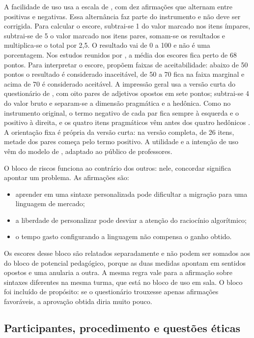 A facilidade de uso usa a escala de , com dez afirmações que alternam entre positivas e negativas. Essa alternância faz parte do instrumento e não deve ser corrigida. Para calcular o escore, subtrai-se 1 do valor marcado nos itens ímpares, subtrai-se de 5 o valor marcado nos itens pares, somam-se os resultados e multiplica-se o total por 2,5. O resultado vai de 0 a 100 e não é uma porcentagem. Nos estudos reunidos por , a média dos escores fica perto de 68 pontos. Para interpretar o escore,  propõem faixas de aceitabilidade: abaixo de 50 pontos o resultado é considerado inaceitável, de 50 a 70 fica na faixa marginal e acima de 70 é considerado aceitável. A impressão geral usa a versão curta do questionário de , com oito pares de adjetivos opostos em sete pontos; subtrai-se 4 do valor bruto e separam-se a dimensão pragmática e a hedônica. Como no instrumento original, o termo negativo de cada par fica sempre à esquerda e o positivo à direita, e os quatro itens pragmáticos vêm antes dos quatro hedônicos \cite{schrepp2023handbook}. A orientação fixa é própria da versão curta: na versão completa, de 26 itens, metade dos pares começa pelo termo positivo. A utilidade e a intenção de uso vêm do modelo de , adaptado ao público de professores.

O bloco de riscos funciona ao contrário dos outros: nele, concordar significa apontar um problema. As afirmações são:

\begin{itemize}
    \item aprender em uma sintaxe personalizada pode dificultar a migração para uma linguagem de mercado;
    \item a liberdade de personalizar pode desviar a atenção do raciocínio algorítmico;
    \item o tempo gasto configurando a linguagem não compensa o ganho obtido.
\end{itemize}
 Os escores desse bloco são relatados separadamente e não podem ser somados aos do bloco de potencial pedagógico, porque as duas medidas apontam em sentidos opostos e uma anularia a outra. A mesma regra vale para a afirmação sobre sintaxes diferentes na mesma turma, que está no bloco de uso em sala. O bloco foi incluído de propósito: se o questionário trouxesse apenas afirmações favoráveis, a aprovação obtida diria muito pouco.

\subsection{Participantes, procedimento e questões éticas}

